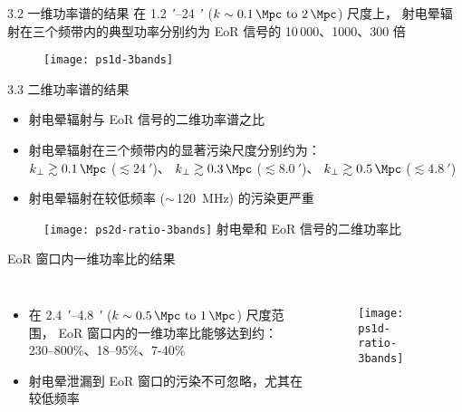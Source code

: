 \documentclass{beamer}
\begin{document}
\begin{frame}{3.2 一维功率谱的结果}
  在 \SI{1.2}{\arcminute}--\SI{24}{\arcminute}
  ($k \sim \SIrange{0.1}{2}{\per\Mpc}$) 尺度上，
  射电晕辐射在三个频带内的典型功率分别约为 EoR 信号的
  10\,000、1000、300 倍

  \begin{figure}
    \centering
    \texttt{[image: ps1d-3bands]}
  \end{figure}
\end{frame}

\begin{frame}{3.3 二维功率谱的结果}
  \begin{itemize}
    \item 射电晕辐射与 EoR 信号的\alert{二维功率谱之比}
    \item 射电晕辐射在三个频带内的显著污染尺度分别约为：\\
      $k_{\perp} \gtrsim \SI{0.1}{\per\Mpc}$
      ($\lesssim \SI{24}{\arcminute}$)、
      $k_{\perp} \gtrsim \SI{0.3}{\per\Mpc}$
      ($\lesssim \SI{8.0}{\arcminute}$)、
      $k_{\perp} \gtrsim \SI{0.5}{\per\Mpc}$
      ($\lesssim \SI{4.8}{\arcminute}$)
    \item 射电晕辐射在较低频率 ($\sim$\,\SI{120}{\MHz}) 的污染更严重
  \end{itemize}

  \begin{figure}
    \centering\footnotesize
    \texttt{[image: ps2d-ratio-3bands]}
    射电晕和 EoR 信号的二维功率比
  \end{figure}
\end{frame}

\begin{frame}[t]
  \begin{alertblock}{EoR 窗口内一维功率比的结果}
  \end{alertblock}
  \begin{columns}
    \begin{itemize}
      \item 在 \SI{2.4}{\arcminute}--\SI{4.8}{\arcminute}
        ($k \sim \SIrange{0.5}{1}{\per\Mpc}$) 尺度范围，
        EoR 窗口内的一维功率比能够达到约：
        230--800\%、18--95\%、7-40\%
      \item 射电晕泄漏到 EoR 窗口的污染不可忽略，尤其在较低频率
    \end{itemize}

    \begin{figure}
      \centering
      \texttt{[image: ps1d-ratio-3bands]}
    \end{figure}
  \end{columns}
\end{frame}
\end{document}
